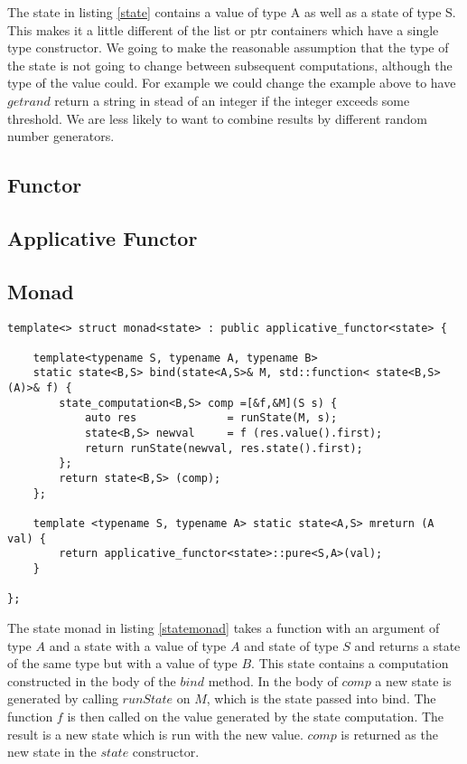\documentclass[12pt,fleqn]{article}
\begin{document}
The state in listing \ref{state} contains a value of type A as well as a state of type S.
This makes it a little different of the list or ptr containers which have a single type constructor.
We going to make the reasonable assumption that the type of the state is not going to change between subsequent computations, although the type of the
value could.
For example we could change the example above to have $getrand$ return a string in stead of an integer if the integer exceeds some threshold.
We are less likely to want to combine results by different random number generators.

%
%
\subsection{Functor}
%

%
%
\subsection{Applicative Functor}
%


%
%
\subsection{Monad}
%


\begin{lstlisting}[caption=state monad, label=statemonad]
template<> struct monad<state> : public applicative_functor<state> {

	template<typename S, typename A, typename B>
	static state<B,S> bind(state<A,S>& M, std::function< state<B,S> (A)>& f) {
		state_computation<B,S> comp =[&f,&M](S s) {
			auto res              = runState(M, s);
			state<B,S> newval     = f (res.value().first);
			return runState(newval, res.state().first);
		};
		return state<B,S> (comp);
	};

	template <typename S, typename A> static state<A,S> mreturn (A val) {
		return applicative_functor<state>::pure<S,A>(val);
	}

};
\end{lstlisting}

The state monad in listing \ref{statemonad} takes a function with an argument of type $A$ and a state with a value of type $A$ and state of type $S$ and 
returns a state of the same type but with a value of type $B$.
This state contains a computation constructed in the body of the $bind$ method.
In the body of $comp$ a new state is generated by calling $runState$ on $M$, which is the state passed into bind. 
The function $f$ is then called on the value generated by the state computation.
The result is a new state which is run with the new value.
$comp$ is returned as the new state in the $state$ constructor.
\end{document}
